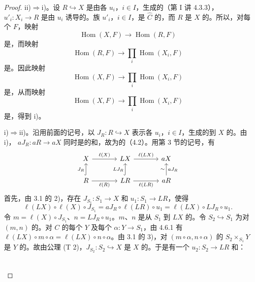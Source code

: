 \begin{proof}
ii)$\Rightarrow$i)。设 $R\hookrightarrow X$ 是由各 $u_i$，$i\in I$，生成的（第 I 讲 4.3.3），$u'_i:X_i\to R$ 是由 $u_i$ 诱导的。族 $u'_i$，$i\in I$，是 $\widehat C$ 的，而 $R$ 是 $X$ 的。所以，对每个 $F$，映射
\[\operatorname{Hom}(X,F)\longrightarrow\operatorname{Hom}(R,F)\]
是，而映射
\[\operatorname{Hom}(R,F)\longrightarrow\prod_i\operatorname{Hom}(X_i,F)\]
是。因此映射
\[\operatorname{Hom}(X,F)\longrightarrow\prod_i\operatorname{Hom}(X_i,F)\]
是，从而映射
\[\operatorname{Hom}(X,F)\longrightarrow\prod_i\operatorname{Hom}(X_i,F)\]
是，得到 i)。

i)$\Rightarrow$ii)。沿用前面的记号，以 $J_R:R\hookrightarrow X$ 表示各 $u_i$，$i\in I$，生成的到 $X$ 的。由 i)， $aJ_R:aR\to aX$ 同时是的和，故为的（4.2）。用第 3 节的记号，有
\[\begin{tikzcd}[column sep=large]
X\arrow[r,"\ell(X)"]&LX\arrow[r,"\ell(LX)"]&aX\\
R\arrow[u,hook,"J_R"]\arrow[r,"\ell(R)"']&LR\arrow[u,hook,"LJ_R"]\arrow[r,"\ell(LR)"']&aR\arrow[u,"aJ_R"',"\sim"]
\end{tikzcd}\]
首先，由 3.1 的 2)，存在 $J_{S_1}:S_1\to X$ 和 $u_1:S_1\to LR$，使得
\[\ell(LX)\circ\ell(X)\circ J_{S_1}=aJ_R\circ\ell(LR)\circ u_1
=\ell(LX)\circ LJ_R\circ u_1.\tag{4.6.1}\]
令 $m=\ell(X)\circ J_{S_1}$、$n=LJ_R\circ u_1$。$m$、$n$ 是从 $S_1$ 到 $LX$ 的。令 $S_2\hookrightarrow S_1$ 为对 $(m,n)$ 的。对 $C$ 的每个 $Y$ 及每个 $\alpha:Y\to S_1$，由 4.6.1 有 $\ell(LX)\circ m\circ\alpha=\ell(LX)\circ n\circ\alpha$。由 3.1 的 3)，对 $(m\circ\alpha,n\circ\alpha)$ 的 $S_2\times_{S_1}Y$ 是 $Y$ 的。故由公理 (T 2)，$J_{S_2}:S_2\hookrightarrow X$ 是 $X$ 的。于是有一个 $u_2:S_2\to LR$ 和：
\[\begin{tikzcd}[column sep=large,row sep=large]

\end{tikzcd}\]
\end{proof}
